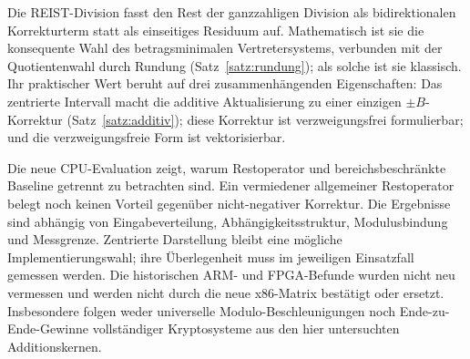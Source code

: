 \documentclass[11pt,a4paper]{scrartcl}
\theoremstyle{definition}
\theoremstyle{plain}
\theoremstyle{remark}
\begin{document}
Die REIST-Division fasst den Rest der ganzzahligen Division als bidirektionalen Korrekturterm statt als einseitiges Residuum auf. Mathematisch ist sie die konsequente Wahl des betragsminimalen Vertretersystems, verbunden mit der Quotientenwahl durch Rundung (Satz~\ref{satz:rundung}); als solche ist sie klassisch. Ihr praktischer Wert beruht auf drei zusammenhängenden Eigenschaften: Das zentrierte Intervall macht die additive Aktualisierung zu einer einzigen $\pm B$-Korrektur (Satz~\ref{satz:additiv}); diese Korrektur ist verzweigungsfrei formulierbar; und die verzweigungsfreie Form ist vektorisierbar.

Die neue CPU-Evaluation zeigt, warum Restoperator und bereichsbeschränkte
Baseline getrennt zu betrachten sind. Ein vermiedener allgemeiner Restoperator
belegt noch keinen Vorteil gegenüber nicht-negativer Korrektur. Die Ergebnisse
sind abhängig von Eingabeverteilung, Abhängigkeitsstruktur, Modulusbindung und
Messgrenze. Zentrierte Darstellung bleibt eine mögliche Implementierungswahl;
ihre Überlegenheit muss im jeweiligen Einsatzfall gemessen werden.
Die historischen ARM- und FPGA-Befunde wurden nicht neu vermessen und werden
nicht durch die neue x86-Matrix bestätigt oder ersetzt. Insbesondere folgen
weder universelle Modulo-Beschleunigungen noch Ende-zu-Ende-Gewinne vollständiger
Kryptosysteme aus den hier untersuchten Additionskernen.
\end{document}
